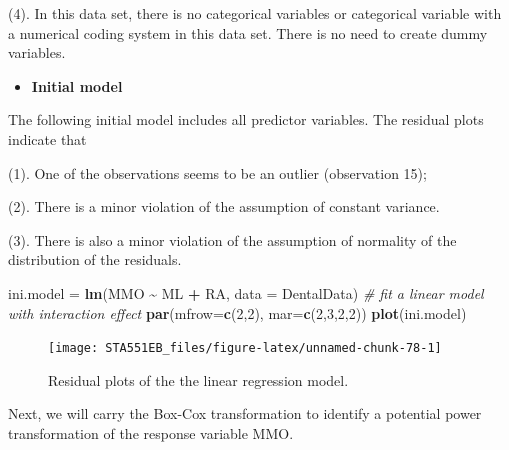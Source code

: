 \documentclass[
]{book}
\newenvironment{Shaded}{\begin{snugshade}}{\end{snugshade}}
\newcommand{\AttributeTok}[1]{\textcolor[rgb]{0.13,0.29,0.53}{#1}}
\newcommand{\CommentTok}[1]{\textcolor[rgb]{0.56,0.35,0.01}{\textit{#1}}}
\newcommand{\DecValTok}[1]{\textcolor[rgb]{0.00,0.00,0.81}{#1}}
\newcommand{\FunctionTok}[1]{\textcolor[rgb]{0.13,0.29,0.53}{\textbf{#1}}}
\newcommand{\NormalTok}[1]{#1}
\newcommand{\OtherTok}[1]{\textcolor[rgb]{0.56,0.35,0.01}{#1}}
\newcommand{\SpecialCharTok}[1]{\textcolor[rgb]{0.81,0.36,0.00}{\textbf{#1}}}
\providecommand{\tightlist}{%
  \setlength{\itemsep}{0pt}\setlength{\parskip}{0pt}}
\begin{document}
(4). In this data set, there is no categorical variables or categorical variable with a numerical coding system in this data set. There is no need to create dummy variables.

\begin{itemize}
\tightlist
\item
  \textbf{Initial model}
\end{itemize}

The following initial model includes all predictor variables. The residual plots indicate that

(1). One of the observations seems to be an outlier (observation 15);

(2). There is a minor violation of the assumption of constant variance.

(3). There is also a minor violation of the assumption of normality of the distribution of the residuals.

\begin{Shaded}
\begin{Highlighting}[]
\NormalTok{ini.model }\OtherTok{=} \FunctionTok{lm}\NormalTok{(MMO }\SpecialCharTok{\textasciitilde{}}\NormalTok{ ML }\SpecialCharTok{+}\NormalTok{ RA, }\AttributeTok{data =}\NormalTok{ DentalData)   }\CommentTok{\# fit a linear model with interaction effect}
\FunctionTok{par}\NormalTok{(}\AttributeTok{mfrow=}\FunctionTok{c}\NormalTok{(}\DecValTok{2}\NormalTok{,}\DecValTok{2}\NormalTok{), }\AttributeTok{mar=}\FunctionTok{c}\NormalTok{(}\DecValTok{2}\NormalTok{,}\DecValTok{3}\NormalTok{,}\DecValTok{2}\NormalTok{,}\DecValTok{2}\NormalTok{))}
\FunctionTok{plot}\NormalTok{(ini.model)}
\end{Highlighting}
\end{Shaded}

\begin{figure}

{\centering \texttt{[image: STA551EB\_files/figure-latex/unnamed-chunk-78-1]} 

}

\caption{Residual plots of the the linear regression model.}\label{fig:unnamed-chunk-78}
\end{figure}

Next, we will carry the Box-Cox transformation to identify a potential power transformation of the response variable MMO.
\end{document}

